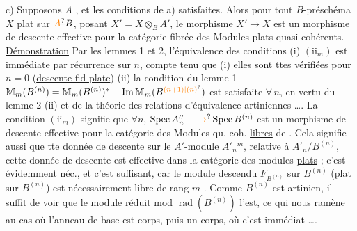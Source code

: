 c) Supposons $A$ , et les conditions de
a) satisfaites. Alors pour tout $B$-préschéma
$X$ plat sur $\deleted{\unsure{A}}B$, posant $X'=X\otimes_B A'$, le morphisme
$X'\to X$ est un morphisme de descente effective
pour la catégorie fibrée des Modules plats quasi-cohérents.
\uline{Démonstration}  Par les lemmes 1  et 2, l'équivalence des
conditions (i)  $(\mathrm{ii}_m)$  est immédiate par récurrence
sur $n$, compte tenu que (i) elles sont ttes
vérifiées pour $n=0$ (\uline{descente fid plate}) (ii) la condition
du lemme 1  $\mathbb M_m(B^{(n)})=\mathbb M_m(B^{(n)})^*+\operatorname{Im}\mathbb M_m(B^{\unsure{(n+1)|(n)}})$
est satisfaite  $\forall\,n$, en vertu du lemme 2 (ii)
et de la théorie des relations d'équivalence
artiniennes \ldots. La condition $(\mathrm{ii}_m)$ signifie que $\forall n$,
$\operatorname{Spec} A''_n\unsure{-|\to}\operatorname{Spec} B^{(n)}$ est un morphisme de descente
effective  pour la catégorie des Modules qu. coh.
\uline{libres} de  . Cela signifie aussi que tte
donnée de descente sur le $A'$-module $A'_n{}^m$,
relative à $A'_n/B^{(n)}$, cette donnée de descente
est effective dans la catégorie des modules \uline{plats} ;
c'est évidemment néc., et c'est suffisant, car
 le module descendu $F_{B^{(n)}}$ sur $B^{(n)}$ (plat sur $B^{(n)}$) est
nécessairement libre de rang $m$ . Comme $B^{(n)}$ est
artinien, il suffit de voir que le module
réduit mod $\operatorname{rad}(B^{(n)})$ l'est, ce qui nous ramène
au cas où l'anneau de base est   corps, puis
un  corps, où c'est immédiat \ldots.

